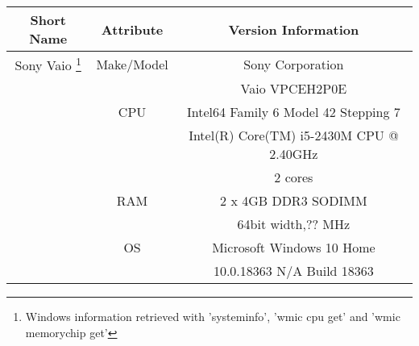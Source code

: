 \begin{center}
 \begin{tabular}{|| c | c | c ||} 
\hline 
Short Name & Attribute & Version Information  \\ 
 \hline
Sony Vaio  \footnote{Windows information retrieved with 'systeminfo',  'wmic cpu get' and 'wmic memorychip get'}
& Make/Model
& Sony Corporation\\
& &  Vaio VPCEH2P0E \\
\cline{2-3}
& CPU
& Intel64 Family 6 Model 42 Stepping 7 \\
& & Intel(R) Core(TM) i5-2430M CPU @ 2.40GHz \\
& & 2 cores \\
\cline{2-3}
&  RAM
& 2 x 4GB DDR3 SODIMM \\
& & 64bit width,?? MHz\\ 
\cline{2-3}
& OS
& Microsoft Windows 10 Home\\
& & 10.0.18363 N/A Build 18363 \\
 \hline \hline
\end{tabular}
\end{center}
